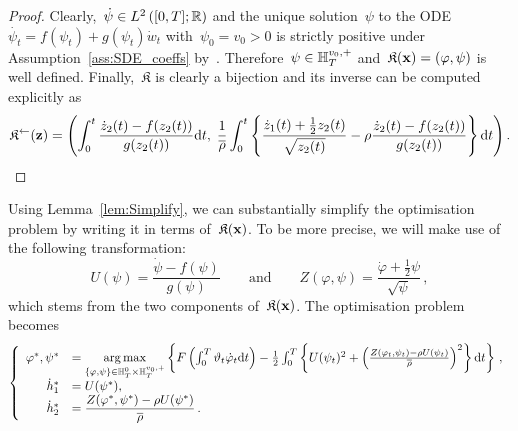 \begin{proof}
Clearly,~$\dot{\psi}\in L^{2}\left([0, T]; \mathbb{R}\right)$ and the unique solution~$\psi$ to the ODE~${\dot{\psi_t}=f(\psi_t)+g(\psi_t)\dot{w}_t}$ with~$\psi_0 = v_0 > 0$ is strictly positive under Assumption~\ref{ass:SDE_coeffs} by~\cite[Proposition 3.11]{Baldi2011GeneralDiffusions}. Therefore~$\psi\in\mathbb{H}_T^{v_0, +}$ and~$\mathfrak{K}(\boldsymbol{\mathrm{x}})=(\varphi, \psi)$ is well defined.
Finally,~$\mathfrak{K}$ is clearly a bijection and its inverse can be computed explicitly as
\[
\mathfrak{K}^{\leftarrow}(\boldsymbol{\mathrm{z}}) = \left(\int_0^t \frac{\dot{z}_2(t)-f(z_2(t))}{g(z_2(t))}\mathrm{d} t,\; \frac1{\overline{\rho}}\int_0^t\left\{ \frac{\dot{z}_1(t) + \frac{1}{2}z_2(t)}{\sqrt{z_2(t)}} - \rho\frac{\dot{z}_2(t)-f(z_2(t))}{g(z_2(t))} \right\} \mathrm{d} t\right).
\]
\end{proof}
Using Lemma~\ref{lem:Simplify}, we can substantially simplify the optimisation problem by writing it in terms of~$\mathfrak{K}(\boldsymbol{\mathrm{x}})$. To be more precise, we will make use of the following transformation:
\begin{equation}\label{eq:transformation_UZ}
U(\psi) = \frac{\dot{\psi} - f(\psi)}{g(\psi)}
\qquad\text{and}\qquad
Z(\varphi,\psi) = \frac{\dot{\varphi} + \frac{1}{2}\psi}{\sqrt{\psi}}\,,
\end{equation}
which stems from the two components of~$\mathfrak{K}(\boldsymbol{\mathrm{x}})$. The optimisation problem becomes
\begin{equation*}
\left\{
\begin{array}{rl}
\varphi^{*},\psi^{*} &= \operatorname*{arg\,max}\limits_{\{\varphi,\psi\} \in \mathbb{H}_T^0\times \mathbb{H}_T^{v_0,+}} \left\{F\left(\int_0^T\vartheta_t \dot{\varphi}_t \mathrm{d} t\right) - \frac{1}{2}\int_0^T \left\{U(\psi_t)^2 + \left(\frac{Z(\varphi_t,\psi_t) - \rho U(\psi_t)}{\overline{\rho}}\right)^2\right\}\mathrm{d} t\right\}\,,\\
\dot{h}_1^{*} &= U(\psi^{*}), \\
\dot{h}_2^{*} &= \displaystyle \frac{Z(\varphi^{*},\psi^{*}) - \rho U(\psi^{*})}{\overline{\rho}}\,.
\end{array}
\right.
\end{equation*}
